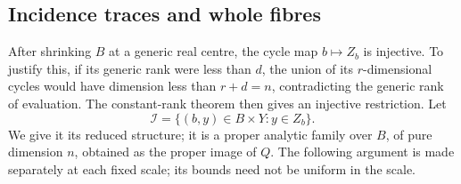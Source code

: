 \subsection{Incidence traces and whole fibres}

After shrinking \(B\) at a generic real centre, the cycle map
\(b\mapsto Z_b\) is injective. To justify this, if its generic
rank were less than \(d\), the union of its \(r\)-dimensional
cycles would have dimension less than \(r+d=n\), contradicting
the generic rank of evaluation. The constant-rank theorem then
gives an injective restriction. Let
\[
 \mathcal I=\{(b,y)\in B\times Y:y\in Z_b\}.
\]
We give it its reduced structure; it is a proper analytic family
over \(B\), of pure dimension \(n\), obtained as the proper image
of \(Q\). The following argument is made separately at each fixed
scale; its bounds need not be uniform in the scale.

